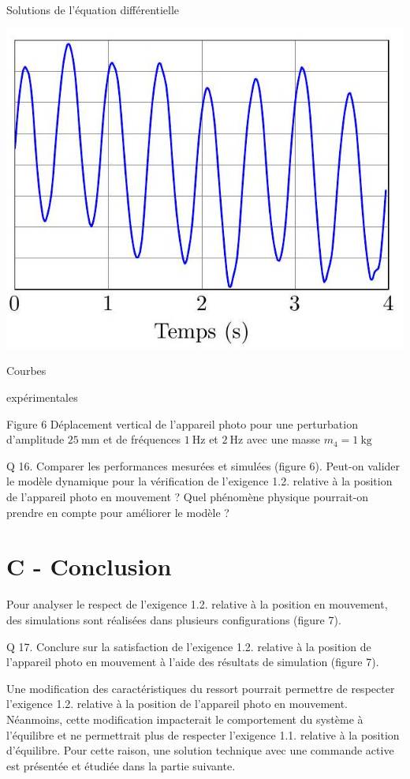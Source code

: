 \documentclass[10pt]{article}
\begin{document}
Solutions de l'équation différentielle

\begin{center}
\includegraphics[max width=\textwidth]{2022_12_31_ed674c1a831ea1bff3a0g-06(2)}
\end{center}

Courbes

expérimentales

Figure 6 Déplacement vertical de l'appareil photo pour une perturbation d'amplitude $25 \mathrm{~mm}$ et de fréquences $1 \mathrm{~Hz}$ et $2 \mathrm{~Hz}$ avec une masse $m_{4}=1 \mathrm{~kg}$

Q 16. Comparer les performances mesurées et simulées (figure 6). Peut-on valider le modèle dynamique pour la vérification de l'exigence 1.2. relative à la position de l'appareil photo en mouvement ? Quel phénomène physique pourrait-on prendre en compte pour améliorer le modèle ?

\section{C - Conclusion}
Pour analyser le respect de l'exigence 1.2. relative à la position en mouvement, des simulations sont réalisées dans plusieurs configurations (figure 7).

Q 17. Conclure sur la satisfaction de l'exigence 1.2. relative à la position de l'appareil photo en mouvement à l'aide des résultats de simulation (figure 7).

Une modification des caractéristiques du ressort pourrait permettre de respecter l'exigence 1.2. relative à la position de l'appareil photo en mouvement. Néanmoins, cette modification impacterait le comportement du système à l'équilibre et ne permettrait plus de respecter l'exigence 1.1. relative à la position d'équilibre. Pour cette raison, une solution technique avec une commande active est présentée et étudiée dans la partie suivante.
\end{document}
